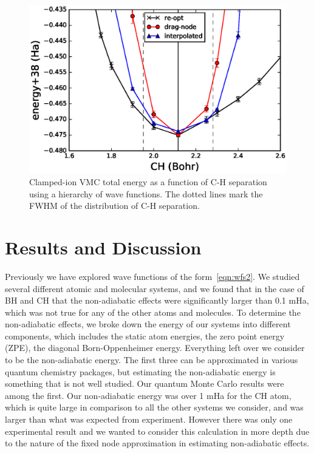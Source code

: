\documentclass[aip,jcp,numerical,reprint]{revtex4-1}
\begin{document}
\begin{figure}[h]
\includegraphics[scale=0.5]{CH-cold}
\caption{Clamped-ion VMC total energy as a function of C-H separation using a hierarchy of wave functions. The dotted lines mark the FWHM of the distribution of C-H separation. \label{fig:ch-cold}}
\end{figure}

\section{Results and Discussion}

Previously we have explored wave functions of the form~\eqref{eqn:wfs2}.  We studied several different atomic and molecular systems, and we found that in the case of BH and CH that the non-adiabatic effects were  significantly larger than 0.1 mHa, which was not true for any of the other atoms and molecules.  To determine the non-adiabatic effects, we broke down the energy of our systems into different components, which includes the static atom energies, the zero point energy (ZPE), the diagonal Born-Oppenheimer energy.   Everything left over we consider to be the non-adiabatic energy.   The first three can be approximated in various quantum chemistry packages, but estimating the non-adiabatic energy is something that is not well studied. Our quantum Monte Carlo results were among the first.  Our non-adiabatic energy was over 1 mHa for the CH atom, which is quite large in comparison to all the other systems we consider, and was larger than what was expected from experiment.  However there was only one experimental result and we wanted to consider this calculation in more depth due to the nature of the fixed node approximation in estimating non-adiabatic effects.
\end{document}
